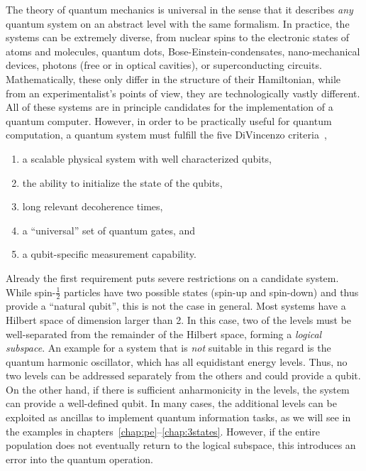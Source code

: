The theory of quantum mechanics is universal in the sense that
it describes \emph{any} quantum system on an abstract level with the same
formalism. In practice, the
systems can be extremely diverse, from nuclear spins to the electronic states of
atoms and molecules, quantum dots, Bose-Einstein-condensates, nano-mechanical
devices, photons (free or in optical cavities), or superconducting circuits.
Mathematically, these only differ in the structure of their Hamiltonian, while
from an experimentalist's points of view, they are technologically vastly
different. All of these systems are in principle candidates for the
implementation of a quantum computer.  However, in order to be practically
useful for quantum computation, a quantum system must
fulfill the five DiVincenzo criteria~\cite{DiVincenzoFP00},
%
\begin{enumerate}
  \item a scalable physical system with well characterized qubits,
        \label{DVC:qubits}
  \item the ability to initialize the state of the qubits,
        \label{DVC:initialization}
  \item long relevant decoherence times,
        \label{DVC:decoherence}
  \item a ``universal'' set of quantum gates, and
        \label{DVC:universal}
  \item a qubit-specific measurement capability.
        \label{DVC:measurement}
\end{enumerate}

Already the first requirement puts severe restrictions on a candidate system.
While spin-$\frac{1}{2}$ particles have two possible states (spin-up and
spin-down) and thus provide a ``natural qubit'', this is not the case in
general. Most systems have a Hilbert space of dimension larger than 2. In this
case, two of the levels must be well-separated from the remainder of the Hilbert
space, forming a \emph{logical subspace}.
%
An example for a system that is \emph{not} suitable in
this regard is the quantum harmonic oscillator, which has all equidistant energy
levels. Thus, no two levels can be addressed separately from the others and
could provide a qubit. On the other hand, if there is sufficient anharmonicity
in the levels, the system can provide a well-defined qubit. In many cases, the
additional levels can be exploited as ancillas to implement quantum information
tasks, as we will see in the examples in
chapters~\ref{chap:pe}--\ref{chap:3states}. However, if the entire population
does not eventually return to the logical subspace, this introduces an error
into the quantum operation.

